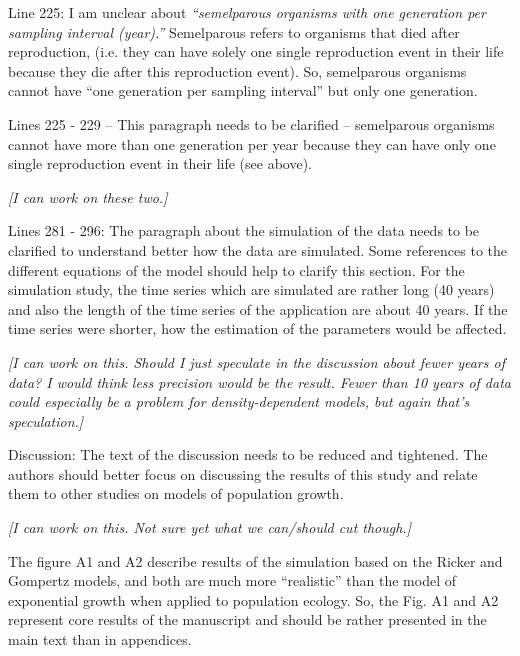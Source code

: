 \documentclass[12pt,english]{article}
\begin{document}
\begin{spacing}{1.9}
\begin{flushleft}
Line 225: I am unclear about \textit{``semelparous organisms with one generation per sampling
interval (year).''} Semelparous refers to organisms that died after reproduction, (i.e. they can
have solely one single reproduction event in their life because they die after this
reproduction event). So, semelparous organisms cannot have ``one generation per sampling
interval'' but only one generation.

Lines 225 - 229 – This paragraph needs to be clarified – semelparous organisms cannot have
more than one generation per year because they can have only one single reproduction
event in their life (see above).

\vspace{0.5cm}
\textit{[I can work on these two.]}
\vspace{0.5cm}

Lines 281 - 296: The paragraph about the simulation of the data needs to be clarified to
understand better how the data are simulated. Some references to the different equations
of the model should help to clarify this section. For the simulation study, the time series
which are simulated are rather long (40 years) and also the length of the time series of the
application are about 40 years. If the time series were shorter, how the estimation of the
parameters would be affected.

\vspace{0.5cm}
\textit{[I can work on this.  Should I just speculate in the discussion about fewer years
of data?  I would think less precision would be the result.  Fewer than 10 years of data
could especially be a problem for density-dependent models, but again that's speculation.]}
\vspace{0.5cm}

Discussion: The text of the discussion needs to be reduced and tightened. The authors
should better focus on discussing the results of this study and relate them to other studies
on models of population growth.

\vspace{0.5cm}
\textit{[I can work on this.  Not sure yet what we can/should cut though.]}
\vspace{0.5cm}

The figure A1 and A2 describe results of the simulation based on the Ricker and Gompertz
models, and both are much more ``realistic'' than the model of exponential growth when
applied to population ecology. So, the Fig. A1 and A2 represent core results of the
manuscript and should be rather presented in the main text than in appendices.


\end{flushleft}
\end{spacing}
\end{document}
